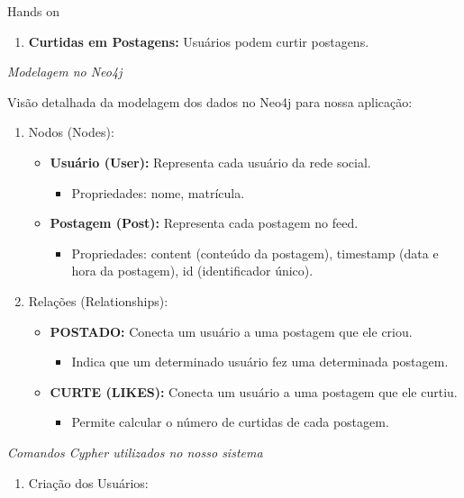 \documentclass{if-beamer}
\begin{document}
\begin{frame}{Hands on}
\begin{overlayarea}{\textwidth}{\textheight}
{\begin{enumerate}
				\item \textbf{Curtidas em Postagens:} Usuários podem curtir postagens.
			\end{enumerate}	
		}
		 {
			\emph{Modelagem no Neo4j}\par
			Visão detalhada da modelagem dos dados no Neo4j para nossa aplicação:
			\begin{enumerate}
				\item Nodos (Nodes):
				\begin{itemize}
					\item \textbf{Usuário (User):} Representa cada usuário da rede social. 
					\begin{itemize}
						\item Propriedades: nome, matrícula.
					\end{itemize}
					\item \textbf{Postagem (Post):} Representa cada postagem no feed.
					\begin{itemize}
						\item Propriedades: content (conteúdo da postagem), timestamp (data e hora da postagem), id (identificador único).
					\end{itemize}
				\end{itemize}
				\item Relações (Relationships):
				\begin{itemize}
					\item \textbf{POSTADO:} Conecta um usuário a uma postagem que ele criou. 
					\begin{itemize}
						\item Indica que um determinado usuário fez uma determinada postagem.
					\end{itemize}
					\item \textbf{CURTE (LIKES):} Conecta um usuário a uma postagem que ele curtiu. 
					\begin{itemize}
						\item Permite calcular o número de curtidas de cada postagem.
					\end{itemize}
				\end{itemize}
			\end{enumerate}
		}
		\only<3> {
			\emph{Comandos Cypher utilizados no nosso sistema}\par
			\begin{enumerate}
				\item Criação dos Usuários:
				
				

\end{enumerate}}
\end{overlayarea}
\end{frame}
\end{document}

